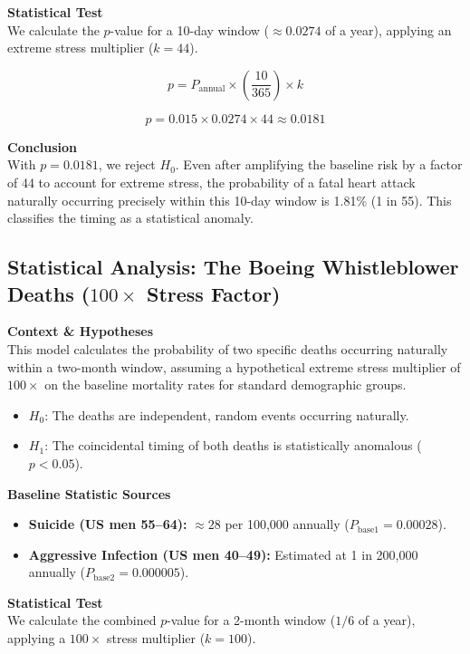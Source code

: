 \documentclass[11pt,a4paper]{article}
\theoremstyle{definition}
\theoremstyle{remark}
\begin{document}
\textbf{Statistical Test}\\
We calculate the $p$-value for a 10-day window ($\approx 0.0274$ of a year), applying an extreme stress multiplier ($k = 44$).

$$ p = P_{\text{annual}} \times \left(\frac{10}{365}\right) \times k $$

$$ p = 0.015 \times 0.0274 \times 44 \approx 0.0181 $$

\textbf{Conclusion}\\
With $p = 0.0181$, we reject $H_0$. Even after amplifying the baseline risk by a factor of 44 to account for extreme stress, the probability of a fatal heart attack naturally occurring precisely within this 10-day window is 1.81\% (1 in 55). This classifies the timing as a statistical anomaly.

\subsection*{Statistical Analysis: The Boeing Whistleblower Deaths ($100\times$ Stress Factor)}

\textbf{Context \& Hypotheses}\\
This model calculates the probability of two specific deaths occurring naturally within a two-month window, assuming a hypothetical extreme stress multiplier of $100\times$ on the baseline mortality rates for standard demographic groups.
\begin{itemize}
    \item $H_0$: The deaths are independent, random events occurring naturally.
    \item $H_1$: The coincidental timing of both deaths is statistically anomalous ($p < 0.05$).
\end{itemize}

\textbf{Baseline Statistic Sources}\\
\begin{itemize}
    \item \textbf{Suicide (US men 55--64):} $\approx 28$ per 100,000 annually ($P_{\text{base1}} = 0.00028$).
    \item \textbf{Aggressive Infection (US men 40--49):} Estimated at 1 in 200,000 annually ($P_{\text{base2}} = 0.000005$).
\end{itemize}

\textbf{Statistical Test}\\
We calculate the combined $p$-value for a 2-month window ($1/6$ of a year), applying a $100\times$ stress multiplier ($k = 100$).
\end{document}
